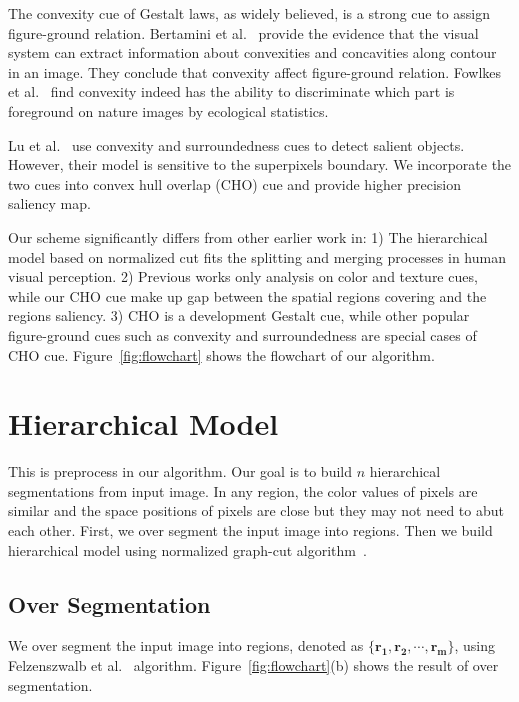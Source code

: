 \documentclass{article}
\begin{document}
The convexity cue of Gestalt laws, as widely believed, is a strong cue to assign figure-ground relation. Bertamini et al.~\cite{bertamini2013processing} provide the evidence that the visual system can extract information about convexities and concavities along contour in an image. They conclude that convexity affect figure-ground relation. Fowlkes et al.~\cite{fowlkes2007local} find convexity indeed has the ability to discriminate which part is foreground on nature images by ecological statistics.

Lu et al.~\cite{lu2011salient} use convexity and surroundedness cues to detect salient objects. However, their model is sensitive to the superpixels boundary. We incorporate the two cues into convex hull overlap (CHO) cue and provide higher precision saliency map.

Our scheme significantly differs from other earlier work in: 1) The hierarchical model based on normalized cut fits the splitting and merging processes in human visual perception. 2) Previous works only analysis on color and texture cues, while our CHO cue make up gap between the spatial regions covering and the regions saliency. 3) CHO is a development Gestalt cue, while other popular figure-ground cues such as convexity and surroundedness are special cases of CHO cue. Figure~\ref{fig:flowchart} shows the flowchart of our algorithm.

\section{Hierarchical Model}
This is preprocess in our algorithm. Our goal is to build $n$ hierarchical segmentations from input image. In any region, the color values of pixels are similar and the space positions of pixels are close but they may not need to abut each other. First, we over segment the input image into regions. Then we build hierarchical model using normalized graph-cut algorithm~\cite{shi2000normalized}.

\subsection{Over Segmentation}
We over segment the input image into regions, denoted as $\{\mathbf{r_1}, \mathbf{r_2}, \cdots, \mathbf{r_m}\}$, using Felzenszwalb et al.~\cite{felzenszwalb2004efficient} algorithm. Figure~\ref{fig:flowchart}(b) shows the result of over segmentation.
\end{document}
